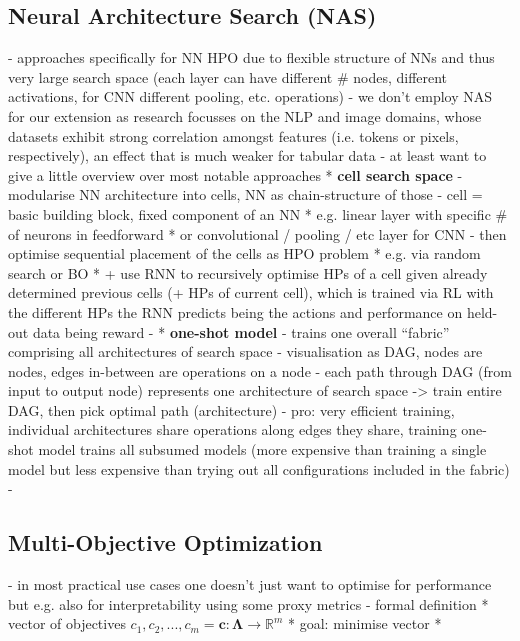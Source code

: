 \documentclass[twoside,11pt]{article}
\begin{document}
\subsection{Neural Architecture Search (NAS)}
- approaches specifically for NN HPO due to flexible structure of NNs and thus very large search space (each layer can have different \# nodes, different activations, for CNN different pooling, etc. operations)
- we don't employ NAS for our extension as research focusses on the NLP and image domains, %
  whose datasets exhibit strong correlation amongst features (i.e. tokens or pixels, respectively), an effect that is much weaker for tabular data \citep[p. 7499]{Borisov_2024}
- at least want to give a little overview over most notable approaches
  * \textbf{cell search space}
    - modularise NN architecture into cells, NN as chain-structure of those
    - cell = basic building block, fixed component of an NN
      * e.g. linear layer with specific \# of neurons in feedforward
      * or convolutional / pooling / etc layer for CNN
    - then optimise sequential placement of the cells as HPO problem
      * e.g. via random search or BO
      * \citet[p. 3]{zoph2017neuralarchitecturesearchreinforcement} + \citet[pp. 2-4]{Zoph_2018_CVPR} use RNN to recursively optimise HPs of a cell given already determined
        previous cells (+ HPs of current cell), which is trained via RL with the different HPs the RNN predicts being the actions and performance on held-out data being reward
    - \citep[chap. 3.2]{elsken_neural_2019}
  * \textbf{one-shot model}
    - trains one overall ``fabric'' comprising all architectures of search space
    - visualisation as DAG, nodes are nodes, edges in-between are operations on a node
    - each path through DAG (from input to output node) represents one architecture of search space -> train entire DAG, then pick optimal path (architecture)
    - pro: very efficient training, individual architectures share operations along edges they share, training one-shot model trains all subsumed models (more expensive
      than training a single model but less expensive than trying out all configurations included in the fabric)
    - \citep[pp. 1-2, p.8]{saxena2017convolutionalneuralfabrics}

\subsection{Multi-Objective Optimization}
- in most practical use cases one doesn't just want to optimise for performance but e.g. also for interpretability using some proxy metrics
- formal definition
  * vector of objectives $c_1,c_2,...,c_m=\boldsymbol{c}:\boldsymbol\Lambda\rightarrow\mathbb{R}^m$
  * goal: minimise vector
  * \citep[p. 11]{10.1145/3610536}
\end{document}
